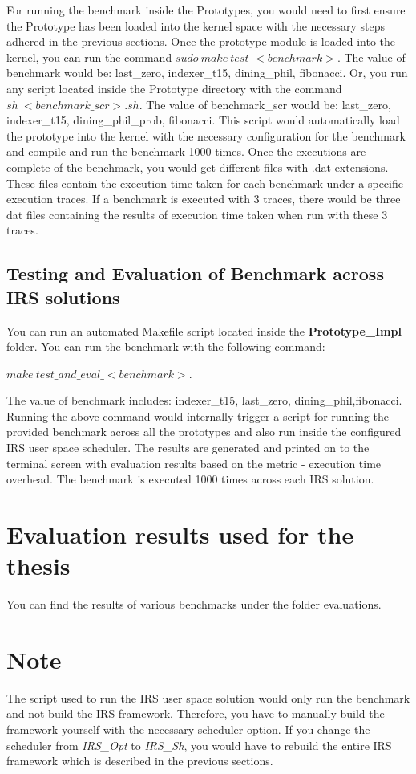 \documentclass[12pt]{article}
\begin{document}
For running the benchmark inside the Prototypes, you would need to first ensure the Prototype has been loaded into the kernel space with the necessary steps adhered in the previous sections. 
Once the prototype module is loaded into the kernel, you can run the command $sudo\ make\ test\_<benchmark>$. 
The value of benchmark would be: {last\_zero, indexer\_t15, dining\_phil, fibonacci}. 
Or, you run any script located inside the Prototype directory with the command $sh\ <benchmark\_scr>.sh$. 
The value of benchmark\_scr would be: {last\_zero, indexer\_t15, dining\_phil\_prob, fibonacci}. 
This script would automatically load the prototype into the kernel with the necessary configuration for the benchmark and compile and run the benchmark 1000 times. 
Once the executions are complete of the benchmark, you would get different files with .dat extensions. 
These files contain the execution time taken for each benchmark under a specific execution traces. 
If a benchmark is executed with 3 traces, there would be three dat files containing the results of execution time taken when run with these 3 traces. 

\subsection*{Testing and Evaluation of Benchmark across IRS solutions}

You can run an automated Makefile script located inside the \textbf{Prototype\_Impl} folder. 
You can run the benchmark with the following command:

$make\ test\_and\_eval\_<benchmark>$.

The value of benchmark includes: {indexer\_t15, last\_zero, dining\_phil,fibonacci}. 
Running the above command would internally trigger a script for running the provided benchmark across all the prototypes and also run inside the configured IRS user space scheduler. 
The results are generated and printed on to the terminal screen with evaluation results based on the metric - execution time overhead. 
The benchmark is executed 1000 times across each IRS solution. 

\section*{Evaluation results used for the thesis} 
You can find the results of various benchmarks under the folder evaluations.


\section*{Note}

The script used to run the IRS user space solution would only run the benchmark and not build the IRS framework. 
Therefore, you have to manually build the framework yourself with the necessary scheduler option. 
If you change the scheduler from \emph{IRS\_Opt} to \emph{IRS\_Sh}, you would have to rebuild the entire IRS framework which is described in the previous sections. 
\end{document}
